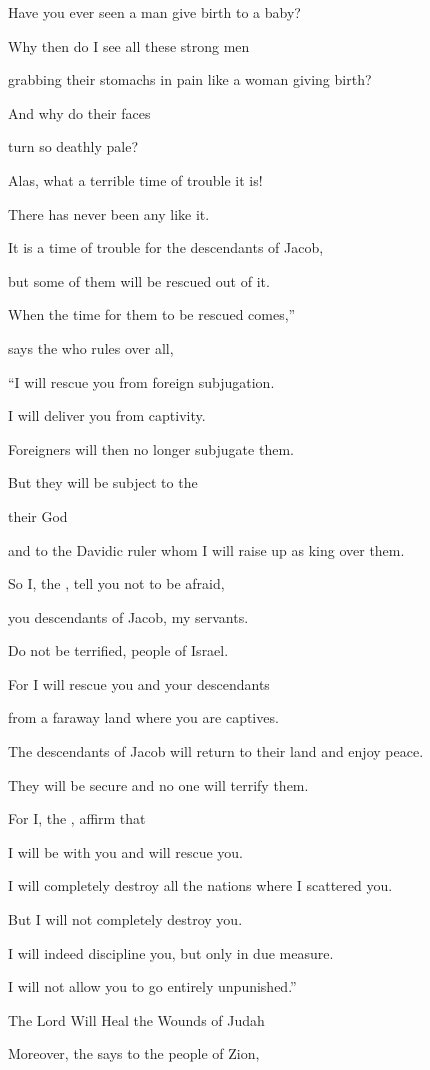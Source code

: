 {\par }{\Q Have
you ever
seen
a man
give birth
to a baby?
\par }{\Q Why
then do I see
all
these strong men
\par }{\Q grabbing
their stomachs
in pain like a
woman giving birth?
\par }{\Q And why do their faces
\par }{\Q turn so deathly
pale?
\par }{\Q {}Alas,
what a terrible
time
of trouble it is!

\par }{\Q There has never
been any like
it.
\par }{\Q It is a time
of trouble
for the descendants of Jacob,
\par }{\Q but some
of them will be rescued out of it.
\par }{\Q {}When
the time
for them to be rescued comes,”

\par }{\Q says
the {}
who rules over all,
\par }{\Q “I will
rescue you from foreign subjugation.
\par }{\Q I will deliver you from captivity.

\par }{\Q Foreigners
will then no
longer
subjugate them.
\par }{\Q {}But they will be subject
to the

{}
their God
\par }{\Q and to the Davidic
ruler whom
I will raise
up as king
over them.
\par }{\Q {}So I, the
{}, tell you
not
to be afraid,
\par }{\Q you descendants of Jacob,
my servants.
\par }{\Q Do not
be terrified,
people of Israel.
\par }{\Q For
I
will rescue
you and your descendants
\par }{\Q from
a faraway
land
where
you are captives.
\par }{\Q The descendants
of Jacob
will return
to their land
and enjoy peace.
\par }{\Q They will be secure
and no
one will terrify them.
\par }{\Q {}For
I,
the {}, affirm
that
\par }{\Q I will be with you
and will rescue
you.
\par }{\Q I will completely
destroy all
the nations
where
I scattered
you.
\par }{\Q But
I will not
completely
destroy you.
\par }{\Q I will indeed discipline
you, but only in due
measure.
\par }{\Q I will not
allow you to go entirely unpunished.”
\par }{\SH The Lord Will Heal the Wounds of Judah
\par }{\PP {}Moreover,
the {}
says
to the people of Zion,

}
